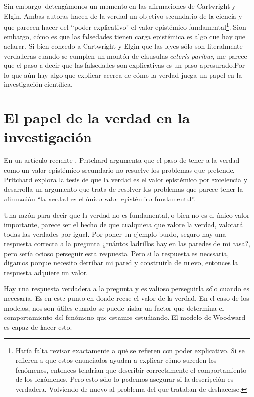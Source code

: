 Sin embargo, detengámonos un momento en las afirmaciones de Cartwright y Elgin. Ambas autoras hacen de la verdad un objetivo secundario de la ciencia y que parecen hacer del ``poder explicativo'' el valor epistémico fundamental\footnote{Haría falta revisar exactamente a qué se refieren con poder explicativo. Si se refieren a que estos enunciados ayudan a explicar cómo suceden los fenómenos, entonces tendrían que describir correctamente el comportamiento de los fenómenos. Pero esto sólo lo podemos asegurar si la descripción es verdadera. Volviendo de nuevo al problema del que trataban de deshacerse.}. Sion embargo, cómo es que las falsedades tienen carga epistémica es algo que hay que aclarar. Si bien concedo a Cartwright y Elgin que las leyes sólo son literalmente verdaderas cuando se cumplen un montón de cláusulas \emph{ceteris paribus}, me parece que el paso a decir que las falsedades son explicativas es un paso apresurado.Por lo que aún hay algo que explicar acerca de cómo la verdad juega un papel en la investigación científica.

\section{El papel de la verdad en la investigación}

\noindent En un artículo reciente \cite{Pritchard2019}, Pritchard argumenta que el paso de tener a la verdad como un valor epistémico secundario no resuelve los problemas que pretende. Pritchard explora la tesis de que la verdad es el valor epistémico por excelencia y desarrolla un argumento que trata de resolver los problemas que parece tener la afirmación ``la verdad es el único valor epistémico fundamental''.

Una razón para decir que la verdad no es fundamental, o bien no es el único valor importante, parece ser el hecho de que cualquiera que valore la verdad, valorará todas las verdades por igual. Por poner un ejemplo burdo, seguro hay una respuesta correcta a la pregunta ¿cuántos ladrillos hay en las paredes de mi casa?, pero sería ocioso perseguir esta respuesta. Pero si la respuesta es necesaria, digamos porque necesito derribar mi pared y construirla de nuevo, entonces la respuesta adquiere un valor.

Hay una respuesta verdadera a la pregunta y es valioso perseguirla sólo cuando es necesaria. Es en este punto en donde recae el valor de la verdad. En el caso de los modelos, nos son útiles cuando se puede aislar un factor que determina el comportamiento del fenómeno que estamos estudiando. El modelo de Woodward es capaz de hacer esto.


